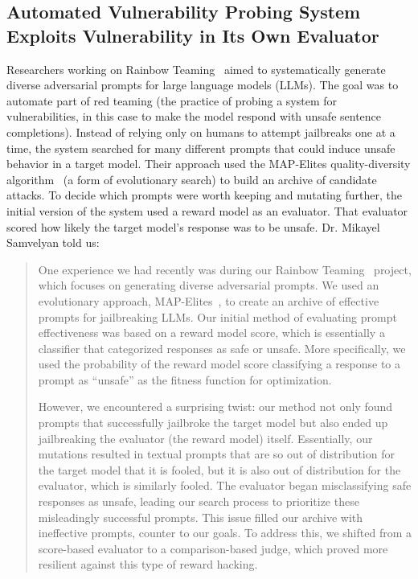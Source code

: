 \subsection{Automated Vulnerability Probing System Exploits Vulnerability in Its Own Evaluator~\citep{samvelyan2024rainbow}}
\label{sec:rainbow}

Researchers working on Rainbow Teaming~\citep{samvelyan2024rainbow} aimed to systematically generate diverse adversarial prompts for large language models (LLMs). 
The goal was to automate part of red teaming (the practice of probing a system for vulnerabilities, in this case to make the model respond with unsafe sentence completions). 
Instead of relying only on humans to attempt jailbreaks one at a time, the system searched for many different prompts that could induce unsafe behavior in a target model. 
Their approach used the MAP-Elites quality-diversity algorithm~\citep{mouret2015illuminating} (a form of evolutionary search) to build an archive of candidate attacks. To decide which prompts were worth keeping and mutating further, the initial version of the system used a reward model as an evaluator. That evaluator scored how likely the target model's response was to be unsafe.
Dr. Mikayel Samvelyan told us:

\begin{quote}
One experience we had recently was during our Rainbow Teaming~\citep{samvelyan2024rainbow} project, which focuses on generating diverse adversarial prompts. We used an evolutionary approach, MAP-Elites~\citep{mouret2015illuminating}, to create an archive of effective prompts for jailbreaking LLMs. 
Our initial method of evaluating prompt effectiveness was based on a reward model score, which is essentially a classifier that categorized responses as safe or unsafe. More specifically, we used the probability of the reward model score classifying a response to a prompt as ``unsafe'' as the fitness function for optimization.

However, we encountered a surprising twist: our method not only found prompts that successfully jailbroke the target model but also ended up jailbreaking the evaluator (the reward model) itself. Essentially, our mutations resulted in textual prompts that are so out of distribution for the target model that it is fooled, but it is also out of distribution for the evaluator, which is similarly fooled. The evaluator began misclassifying safe responses as unsafe, leading our search process to prioritize these misleadingly successful prompts. This issue filled our archive with ineffective prompts, counter to our goals.
To address this, we shifted from a score-based evaluator to a comparison-based judge, which proved more resilient against this type of reward hacking.

\end{quote}

